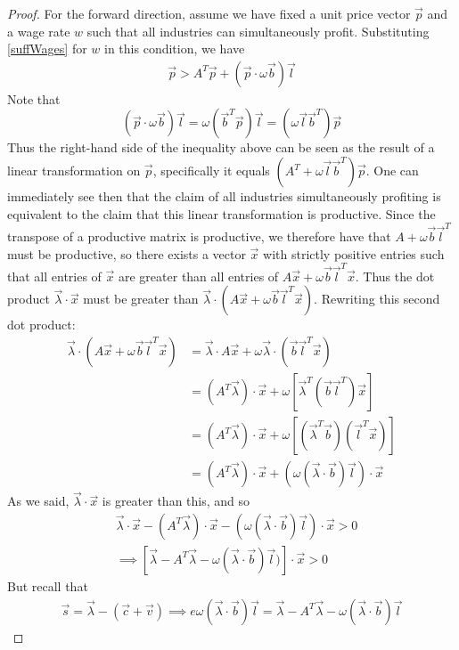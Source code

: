 \begin{proof}
	For the forward direction, assume we have fixed a unit price vector $\vec{p}$ and a wage rate $w$ such that all industries can simultaneously profit. Substituting \ref{suffWages} for $w$ in this condition, we have
\begin{align*}
	\vec{p} > A^T\vec{p} + (\vec{p}\cdot \omega \vec{b})\vec{l} \label{profitability} 
\end{align*} 
Note that 
\[ (\vec{p} \cdot \omega \vec{b}) \vec{l} = \omega (\vec{b}^T \vec{p})\vec{l} = (\omega \vec{l} \vec{b}^T)\vec{p} \]
Thus the right-hand side of the inequality above can be seen as the result of a linear transformation on $\vec{p}$, specifically it equals $(A^T + \omega \vec{l} \vec{b}^T)\vec{p}$. One can immediately see then that the claim of all industries simultaneously profiting is equivalent to the claim that this linear transformation is productive. Since the transpose of a productive matrix is productive, we therefore have that $A+\omega\vec{b}\vec{l}^T$ must be productive, so there exists a vector $\vec{x}$ with strictly positive entries such that all entries of $\vec{x}$ are greater than all entries of $A\vec{x} + \omega\vec{b}\vec{l}^T\vec{x}$. Thus the dot product $\vec{\lambda}\cdot\vec{x}$ must be greater than $\vec{\lambda}\cdot (A\vec{x} + \omega\vec{b}\vec{l}^T\vec{x})$. Rewriting this second dot product:
\begin{align*}
	\vec{\lambda}\cdot (A\vec{x} + \omega\vec{b}\vec{l}^T\vec{x}) &= \vec{\lambda}\cdot A\vec{x} + \omega\vec{\lambda} \cdot (\vec{b}\vec{l}^T\vec{x}) \\
	&= (A^T\vec{\lambda})\cdot \vec{x} + \omega[\vec{\lambda}^T(\vec{b}\vec{l}^T)\vec{x}] \\
	&= (A^T\vec{\lambda})\cdot \vec{x} + \omega[(\vec{\lambda}^T\vec{b})(\vec{l}^T\vec{x})] \\
	&= (A^T\vec{\lambda})\cdot \vec{x} + (\omega(\vec{\lambda}\cdot\vec{b})\vec{l})\cdot\vec{x}
\end{align*}
As we said, $\vec{\lambda}\cdot\vec{x}$ is greater than this, and so
\begin{align*}
	& \vec{\lambda}\cdot\vec{x} - (A^T\vec{\lambda})\cdot \vec{x} - (\omega(\vec{\lambda}\cdot\vec{b})\vec{l})\cdot\vec{x} > 0 \\
	&\implies [\vec{\lambda} - A^T\vec{\lambda} - \omega(\vec{\lambda}\cdot\vec{b})\vec{l})]\cdot\vec{x} > 0
\end{align*} 
But recall that 
\begin{align*}
 \vec{s} = \vec{\lambda} - (\vec{c}+\vec{v}) \implies e\omega(\vec{\lambda}\cdot\vec{b})\vec{l} = \vec{\lambda} - A^T\vec{\lambda} - \omega(\vec{\lambda}\cdot\vec{b})\vec{l}

\end{align*}
\end{proof}
